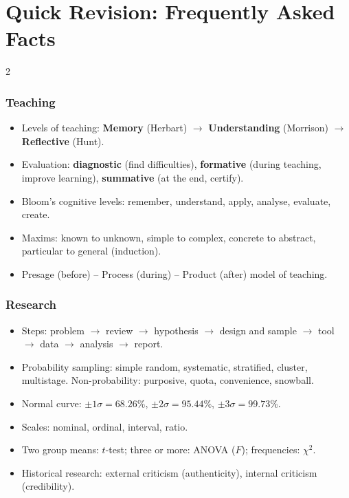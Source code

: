 \chapter*{Quick Revision: Frequently Asked Facts}

\small
\begin{multicols}{2}
\subsection*{Teaching}
\begin{itemize}
\item Levels of teaching: \textbf{Memory} (Herbart) $\rightarrow$ \textbf{Understanding} (Morrison) $\rightarrow$ \textbf{Reflective} (Hunt).
\item Evaluation: \textbf{diagnostic} (find difficulties), \textbf{formative} (during teaching, improve learning), \textbf{summative} (at the end, certify).
\item Bloom's cognitive levels: remember, understand, apply, analyse, evaluate, create.
\item Maxims: known to unknown, simple to complex, concrete to abstract, particular to general (induction).
\item Presage (before) -- Process (during) -- Product (after) model of teaching.
\end{itemize}
\subsection*{Research}
\begin{itemize}
\item Steps: problem $\rightarrow$ review $\rightarrow$ hypothesis $\rightarrow$ design and sample $\rightarrow$ tool $\rightarrow$ data $\rightarrow$ analysis $\rightarrow$ report.
\item Probability sampling: simple random, systematic, stratified, cluster, multistage. Non-probability: purposive, quota, convenience, snowball.
\item Normal curve: $\pm1\sigma=68.26\%$, $\pm2\sigma=95.44\%$, $\pm3\sigma=99.73\%$.
\item Scales: nominal, ordinal, interval, ratio.
\item Two group means: $t$-test; three or more: ANOVA ($F$); frequencies: $\chi^2$.
\item Historical research: external criticism (authenticity), internal criticism (credibility).
\end{itemize}

\end{multicols}
